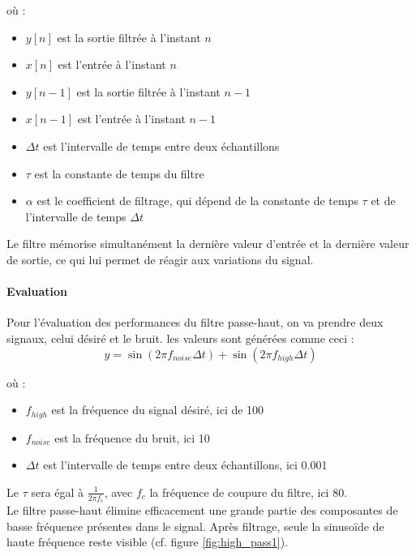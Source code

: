 où :
\begin{itemize}
    \item $y[n]$ est la sortie filtrée à l'instant $n$
    \item $x[n]$ est l'entrée à l'instant $n$
    \item $y[n-1]$ est la sortie filtrée à l'instant $n-1$
    \item $x[n-1]$ est l'entrée à l'instant $n-1$
    \item $\Delta t$ est l'intervalle de temps entre deux échantillons
    \item $\tau$ est la constante de temps du filtre
    \item $\alpha$ est le coefficient de filtrage, qui dépend de la constante de temps $\tau$ et de l'intervalle 
    de temps $\Delta t$
\end{itemize}

Le filtre mémorise simultanément la dernière valeur d'entrée et la dernière valeur de sortie, ce qui lui permet de réagir aux variations du signal. \\

\paragraph{Evaluation}

Pour l'évaluation des performances du filtre passe-haut, on va prendre deux signaux, celui désiré et le bruit. les valeurs sont générées comme ceci :
\begin{equation}
    y = \sin(2 \pi f_{noise} \Delta t) + \sin(2 \pi f_{high} \Delta t)
\end{equation}

où : 
\begin{itemize}
    \item $f_{high}$ est la fréquence du signal désiré, ici de 100
    \item $f_{noise}$ est la fréquence du bruit, ici 10
    \item $\Delta t$ est l'intervalle de temps entre deux échantillons, ici 0.001
\end{itemize}

Le $\tau$ sera égal à $\frac{1}{2 \pi f_c}$, avec $f_c$ la fréquence de coupure du filtre, ici 80. \\

Le filtre passe-haut élimine efficacement une grande partie des composantes de basse fréquence présentes dans le signal. Après filtrage, seule la sinusoïde de haute fréquence reste visible (cf. figure \ref{fig:high_pass1}). \\

